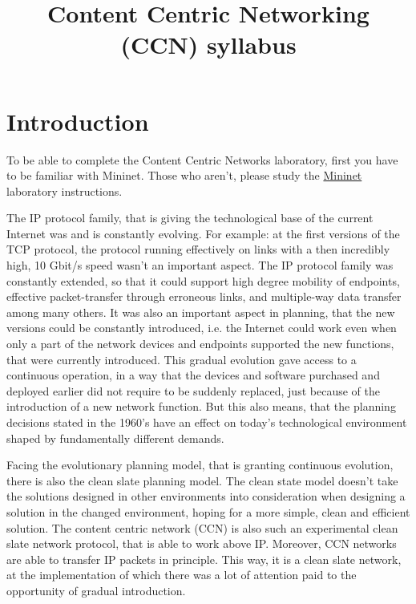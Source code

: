 \documentclass[a4paper]{article}
\title{Content Centric Networking (CCN) syllabus}
\author{}
\date{}
\begin{document}
\maketitle

\tableofcontents

\section{Introduction}

To be able to complete the Content Centric Networks laboratory, first you have to be familiar with
Mininet. Those who aren't, please study the \href{https://qosip.tmit.bme.hu/foswiki/pub/Meres/OpenFlowMSc/OpenFlow-Mininet-syllabus-en.pdf}{Mininet} laboratory instructions.

The IP protocol family, that is giving the technological base of the current Internet was and is 
constantly evolving. For example: at the first versions of the TCP protocol, the protocol running
 effectively on links with a then incredibly high, 10 Gbit/s speed wasn't an important aspect. The 
IP protocol family was constantly extended, so that it could support high degree mobility of endpoints,
 effective packet-transfer through erroneous links, and multiple-way data transfer among many others.
It was also an important aspect in planning, that the new versions could be constantly introduced,
i.e. the Internet could work even when only a part of the network devices and endpoints supported 
the new functions, that were currently introduced. This gradual evolution gave access to a continuous 
operation, in a way that the devices and software purchased and deployed earlier did not require to be
suddenly replaced, just because of the introduction of a new network function. But this also means,
that the planning decisions stated in the 1960's have an effect on today's technological environment
shaped by fundamentally different demands.

Facing the evolutionary planning model, that is granting continuous evolution, there is also the
clean slate planning model. The clean state model doesn't take the solutions designed in other
environments into consideration when designing a solution in the changed environment, hoping for
a more simple, clean and efficient solution. The content centric network (CCN) is also such an
experimental clean slate network protocol, that is able to work above IP. Moreover, CCN networks
are able to transfer IP packets in principle. This way, it is a clean slate network, at the 
implementation of which there was a lot of attention paid to the opportunity of gradual introduction.
\end{document}
